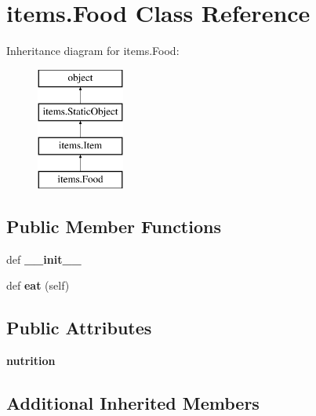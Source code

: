 \hypertarget{classitems_1_1_food}{}\section{items.\+Food Class Reference}
\label{classitems_1_1_food}
Inheritance diagram for items.\+Food\+:\begin{figure}[H]
\begin{center}
\leavevmode
\includegraphics[height=4.000000cm]{classitems_1_1_food}
\end{center}
\end{figure}
\subsection*{Public Member Functions}
\begin{DoxyCompactItemize}
\item 
\hypertarget{classitems_1_1_food_a458be771fe0a89b1d465a0964c019ad8}{}def {\bfseries \+\_\+\+\_\+init\+\_\+\+\_\+}\label{classitems_1_1_food_a458be771fe0a89b1d465a0964c019ad8}

\item 
\hypertarget{classitems_1_1_food_a7d4c62eae09037dbe83b22b78e4984a7}{}def {\bfseries eat} (self)\label{classitems_1_1_food_a7d4c62eae09037dbe83b22b78e4984a7}

\end{DoxyCompactItemize}
\subsection*{Public Attributes}
\begin{DoxyCompactItemize}
\item 
\hypertarget{classitems_1_1_food_adcbdd87fea6d77e1f706da544ba864c2}{}{\bfseries nutrition}\label{classitems_1_1_food_adcbdd87fea6d77e1f706da544ba864c2}

\end{DoxyCompactItemize}
\subsection*{Additional Inherited Members}


